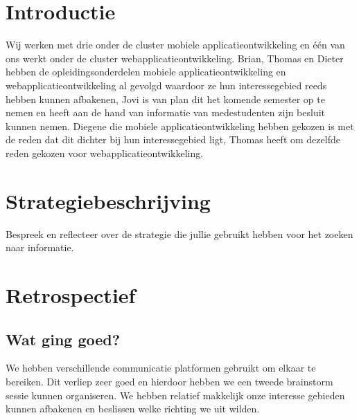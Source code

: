 \documentclass[fleqn,10pt]{voorstel}
\begin{document}
\flushbottom %

\maketitle %

\tableofcontents %

\thispagestyle{empty} %


\section{Introductie} %
Wij werken met drie onder de cluster mobiele applicatieontwikkeling en één van ons werkt onder de cluster webapplicatieontwikkeling. Brian, Thomas en Dieter hebben de opleidingsonderdelen mobiele applicatieontwikkeling en webapplicatieontwikkeling
al gevolgd waardoor ze hun interessegebied reeds hebben kunnen afbakenen, Jovi is van plan dit het komende semester op te nemen en heeft aan de hand van informatie van medestudenten zijn besluit kunnen nemen.
Diegene die mobiele applicatieontwikkeling hebben gekozen is met de reden dat dit dichter bij hun interessegebied ligt, Thomas heeft om dezelfde reden gekozen voor webapplicatieontwikkeling.

\section{Strategiebeschrijving}
Bespreek en reflecteer over de strategie die jullie gebruikt hebben voor het zoeken naar informatie.

\section{Retrospectief}
\subsection{Wat ging goed?}
We hebben verschillende communicatie platformen gebruikt om elkaar te bereiken. Dit verliep zeer goed en hierdoor hebben we een tweede brainstorm sessie kunnen organiseren.
We hebben relatief makkelijk onze interesse gebieden kunnen afbakenen en beslissen welke richting we uit wilden.
\end{document}
